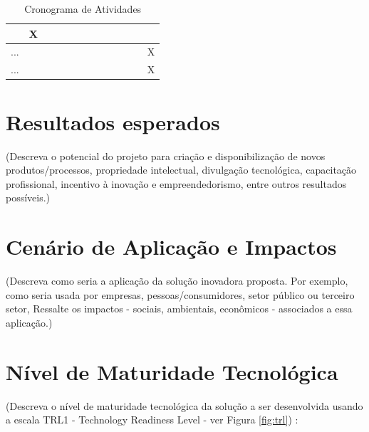 \documentclass[11pt]{article}
\begin{document}
\begin{table}[h]
\begin{tabularx}{\textwidth}{|X|cccccccccccc|}
    \multicolumn{1}{c|}{ } & %
    X \\ \hline %
 ... &
    \multicolumn{1}{c|}{ } & %
    \multicolumn{1}{c|}{ } & %
    \multicolumn{1}{c|}{ } & %
    \multicolumn{1}{c|}{ } & %
    \multicolumn{1}{c|}{ } & %
    \multicolumn{1}{c|}{ } & %
    \multicolumn{1}{c|}{ } & %
    \multicolumn{1}{c|}{ } & %
    \multicolumn{1}{c|}{ } & %
    \multicolumn{1}{c|}{ } & %
    \multicolumn{1}{c|}{ } & %
    X \\ \hline %
 ... &
    \multicolumn{1}{c|}{ } & %
    \multicolumn{1}{c|}{ } & %
    \multicolumn{1}{c|}{ } & %
    \multicolumn{1}{c|}{ } & %
    \multicolumn{1}{c|}{ } & %
    \multicolumn{1}{c|}{ } & %
    \multicolumn{1}{c|}{ } & %
    \multicolumn{1}{c|}{ } & %
    \multicolumn{1}{c|}{ } & %
    \multicolumn{1}{c|}{ } & %
    \multicolumn{1}{c|}{ } & %
    X \\ \hline %
\end{tabularx}
\caption{Cronograma de Atividades}
\label{tab:cronograma}
\end{table}


\section{Resultados esperados}
(Descreva o potencial do projeto para criação e disponibilização de novos produtos/processos,
propriedade intelectual, divulgação tecnológica, capacitação profissional, incentivo à inovação
e empreendedorismo, entre outros resultados possíveis.)


\section{Cenário de Aplicação e Impactos}
(Descreva como seria a aplicação da solução inovadora proposta. Por exemplo, como seria
usada por empresas, pessoas/consumidores, setor público ou terceiro setor, Ressalte os
impactos - sociais, ambientais, econômicos - associados a essa aplicação.)


\section{Nível de Maturidade Tecnológica}
(Descreva o nível de maturidade tecnológica da solução a ser desenvolvida usando a escala
TRL1 - Technology Readiness Level - ver Figura \ref{fig:trl}) \cite{johnc.mankins1995}:
\end{document}

